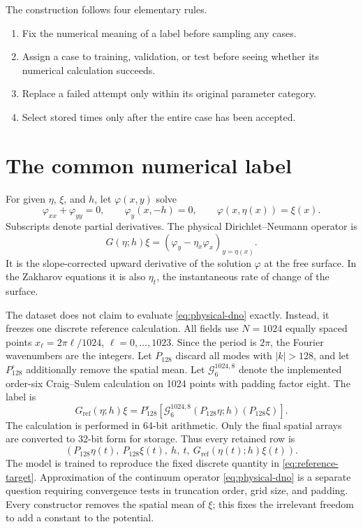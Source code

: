 \documentclass[10pt]{article}
\newcommand{\Gref}{G_{\mathrm{ref}}}
\begin{document}
The construction follows four elementary rules.
\begin{enumerate}
  \item Fix the numerical meaning of a label before sampling any cases.
  \item Assign a case to training, validation, or test before seeing whether
        its numerical calculation succeeds.
  \item Replace a failed attempt only within its original parameter category.
  \item Select stored times only after the entire case has been accepted.
\end{enumerate}

\section{The common numerical label}
\label{sec:target}

For given $\eta$, $\xi$, and $h$, let $\varphi(x,y)$ solve
\begin{equation}
  \varphi_{xx}+\varphi_{yy}=0,\qquad
  \varphi_y(x,-h)=0,\qquad
  \varphi(x,\eta(x))=\xi(x).
\end{equation}
Subscripts denote partial derivatives.
The physical Dirichlet--Neumann operator is
\begin{equation}
  G(\eta;h)\xi
  =\left(\varphi_y-\eta_x\varphi_x\right)_{y=\eta(x)}.
  \label{eq:physical-dno}
\end{equation}
It is the slope-corrected upward derivative of the solution $\varphi$ at the
free surface.  In the Zakharov equations it is also $\eta_t$, the
instantaneous rate of change of the surface.

The dataset does not claim to evaluate \eqref{eq:physical-dno} exactly.
Instead, it freezes one discrete reference calculation.  All fields use
$N=1024$ equally spaced points
$x_\ell=2\pi\ell/1024$, $\ell=0,\ldots,1023$.  Since the period is $2\pi$,
the Fourier wavenumbers are the integers.  Let $P_{128}$ discard all modes with
$|k|>128$, and let $P_{128}^{\circ}$ additionally remove the spatial mean.
Let $\mathcal G_{6}^{1024,8}$ denote the implemented order-six
Craig--Sulem calculation on 1024 points with padding factor eight.  The label
is
\begin{equation}
  \boxed{
  \Gref(\eta;h)\xi
  =
  P_{128}^{\circ}\!\left[
    \mathcal G_{6}^{1024,8}
      (P_{128}\eta;h)(P_{128}\xi)
  \right].}
  \label{eq:reference-target}
\end{equation}
The calculation is performed in 64-bit arithmetic.  Only the final spatial
arrays are converted to 32-bit form for storage.  Thus every retained row is
\begin{equation}
  \left(
    P_{128}\eta(t),\
    P_{128}\xi(t),\
    h,\
    t,\
    \Gref(\eta(t);h)\xi(t)
  \right).
  \label{eq:stored-row}
\end{equation}
The model is trained to reproduce the fixed discrete quantity in
\eqref{eq:reference-target}.  Approximation of the continuum operator
\eqref{eq:physical-dno} is a separate question requiring convergence tests
in truncation order, grid size, and padding.
Every constructor removes the spatial mean of $\xi$; this fixes the
irrelevant freedom to add a constant to the potential.
\end{document}
